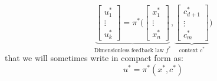 \begin{equation}
\underbrace{
\begin{bmatrix}
u_1^* \\
\vdots \\
u_k^*
\end{bmatrix}
=
\pi^* \Biggl(
\begin{bmatrix}
x_1^* \\
\vdots \\
x_n^*
\end{bmatrix}
}_{\text{Dimensionless feedback law $f^*$}}
,
\underbrace{
\begin{bmatrix}
c_{d+1}^* \\
\vdots \\
c_{m}^*
\end{bmatrix}
}_{\text{context $c^*$}}
\Biggr)
\label{eq:vectordimpolicy}
\end{equation}
that we will sometimes write in compact form as: 
\begin{equation}
u^* = \pi^*( x^* , c^* )
\label{eq:vectordimpolicyshort}
\end{equation}

